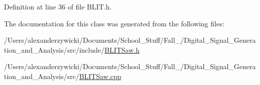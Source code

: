 Definition at line 36 of file B\+L\+I\+T.\+h.



The documentation for this class was generated from the following files\+:\begin{DoxyCompactItemize}
\item 
/\+Users/alexanderzywicki/\+Documents/\+School\+\_\+\+Stuff/\+Fall\+\_/\+Digital\+\_\+\+Signal\+\_\+\+Generation\+\_\+and\+\_\+\+Analysis/src/include/\hyperlink{BLITSaw_8h}{B\+L\+I\+T\+Saw.\+h}\item 
/\+Users/alexanderzywicki/\+Documents/\+School\+\_\+\+Stuff/\+Fall\+\_/\+Digital\+\_\+\+Signal\+\_\+\+Generation\+\_\+and\+\_\+\+Analysis/src/\hyperlink{BLITSaw_8cpp}{B\+L\+I\+T\+Saw.\+cpp}\end{DoxyCompactItemize}
